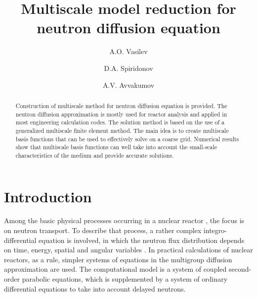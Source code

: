 \documentclass[runningheads]{llncs}
\begin{document}
%
\title{Multiscale model reduction for neutron diffusion equation}
%
%
\author{A.O. Vasilev \and 
D.A. Spiridonov \and
A.V. Avvakumov }
%
%
%
\maketitle              %
%
\begin{abstract}
Construction of multiscale method for neutron diffusion equation is provided. 
The neutron diffusion approximation is mostly used for reactor analysis and applied in most engineering calculation codes. 
The solution method is based on the use of a generalized multiscale finite element method.
The main idea is to create multiscale basis functions that can be used to effectively solve on a coarse grid.
Numerical results show that multiscale basis functions can well take into account the small-scale characteristics of the medium and provide accurate solutions. 

\end{abstract}

\section{Introduction}
Among the basic physical processes occurring in a nuclear reactor \cite{Duderstadt1976}, the focus is on neutron transport. 
To describe that process, a rather complex integro-differential equation is involved, in which the neutron flux distribution depends on time, energy, spatial and angular variables \cite{Stacey2007}.
In practical calculations of nuclear reactors, as a rule, simpler systems of equations in the multigroup diffusion approximation are used. 
The computational model is a system of coupled second-order parabolic equations, which is supplemented by a system of ordinary differential equations to take into account delayed neutrons.
\end{document}
